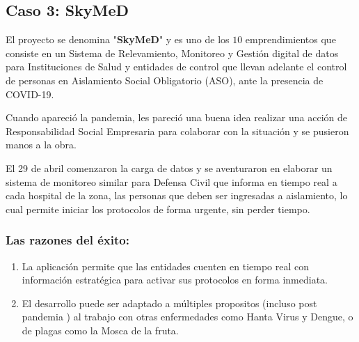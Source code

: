 \documentclass[titlepage,a4paper,twoside]{article}
\begin{document}
    \subsection{Caso 3: SkyMeD}
    
    
    El proyecto se denomina "\textbf{SkyMeD}" y es uno de los $10$ emprendimientos que consiste en un Sistema de Relevamiento, Monitoreo y Gestión digital de datos para Instituciones de Salud y entidades de control que llevan adelante el control de personas en Aislamiento Social Obligatorio (ASO), ante la presencia de COVID-19.
    
    Cuando apareció la pandemia, les pareció una buena idea realizar una acción de Responsabilidad Social Empresaria para colaborar con la situación y se pusieron manos a la obra.
    
    El 29 de abril comenzaron la carga de datos y se aventuraron en elaborar un sistema de monitoreo similar para Defensa Civil que informa en tiempo real a cada hospital de la zona, las personas que deben ser ingresadas a aislamiento, lo cual permite iniciar los protocolos de forma urgente, sin perder tiempo.
    
    
    \subsubsection{Las razones del éxito:}
    
    
    \begin{enumerate}
    	\item La aplicación permite que las entidades cuenten en tiempo real con información estratégica para activar sus protocolos en forma inmediata.
    	
    	\item El desarrollo puede ser adaptado a múltiples propositos (incluso post pandemia ) al trabajo con otras enfermedades como Hanta Virus y Dengue, o de plagas como la Mosca de la fruta.
    \end{enumerate}
    
\end{document}
